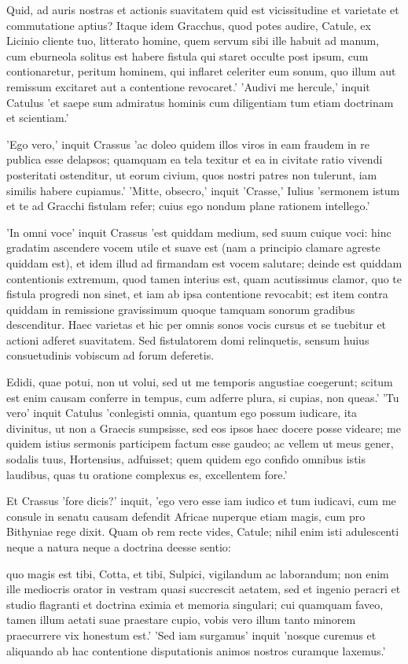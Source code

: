  Quid, ad auris nostras et actionis suavitatem quid est vicissitudine et varietate et commutatione aptius? Itaque idem Gracchus, quod potes audire, Catule, ex Licinio cliente tuo, litterato homine, quem servum sibi ille habuit ad manum, cum eburneola solitus est habere fistula qui staret occulte post ipsum, cum contionaretur, peritum hominem, qui inflaret celeriter eum sonum, quo illum aut remissum excitaret aut a contentione revocaret.' 'Audivi me hercule,' inquit Catulus 'et saepe sum admiratus hominis cum diligentiam tum etiam doctrinam et scientiam.'

 'Ego vero,' inquit Crassus 'ac doleo quidem illos viros in eam fraudem in re publica esse delapsos; quamquam ea tela texitur et ea in civitate ratio vivendi posteritati ostenditur, ut eorum civium, quos nostri patres non tulerunt, iam similis habere cupiamus.' 'Mitte, obsecro,' inquit 'Crasse,' Iulius 'sermonem istum et te ad Gracchi fistulam refer; cuius ego nondum plane rationem intellego.'

 'In omni voce' inquit Crassus 'est quiddam medium, sed suum cuique voci: hinc gradatim ascendere vocem utile et suave est (nam a principio clamare agreste quiddam est), et idem illud ad firmandam est vocem salutare; deinde est quiddam contentionis extremum, quod tamen interius est, quam acutissimus clamor, quo te fistula progredi non sinet, et iam ab ipsa contentione revocabit; est item contra quiddam in remissione gravissimum quoque tamquam sonorum gradibus descenditur. Haec varietas et hic per omnis sonos vocis cursus et se tuebitur et actioni adferet suavitatem. Sed fistulatorem domi relinquetis, sensum huius consuetudinis vobiscum ad forum deferetis.

 Edidi, quae potui, non ut volui, sed ut me temporis angustiae coegerunt; scitum est enim causam conferre in tempus, cum adferre plura, si cupias, non queas.' 'Tu vero' inquit Catulus 'conlegisti omnia, quantum ego possum iudicare, ita divinitus, ut non a Graecis sumpsisse, sed eos ipsos haec docere posse videare; me quidem istius sermonis participem factum esse gaudeo; ac vellem ut meus gener, sodalis tuus, Hortensius, adfuisset; quem quidem ego confido omnibus istis laudibus, quas tu oratione complexus es, excellentem fore.'

 Et Crassus 'fore dicis?' inquit, 'ego vero esse iam iudico et tum iudicavi, cum me consule in senatu causam defendit Africae nuperque etiam magis, cum pro Bithyniae rege dixit. Quam ob rem recte vides, Catule; nihil enim isti adulescenti neque a natura neque a doctrina deesse sentio:

 quo magis est tibi, Cotta, et tibi, Sulpici, vigilandum ac laborandum; non enim ille mediocris orator in vestram quasi succrescit aetatem, sed et ingenio peracri et studio flagranti et doctrina eximia et memoria singulari; cui quamquam faveo, tamen illum aetati suae praestare cupio, vobis vero illum tanto minorem praecurrere vix honestum est.' 'Sed iam surgamus' inquit 'nosque curemus et aliquando ab hac contentione disputationis animos nostros curamque laxemus.'
